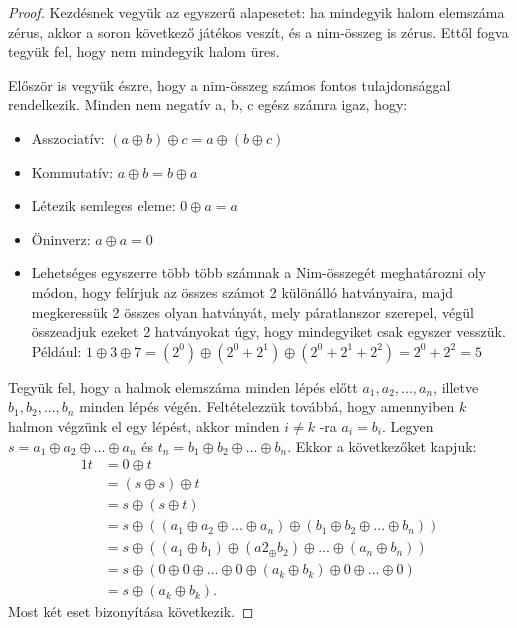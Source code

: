\begin{proof}
Kezdésnek vegyük az egyszerű alapesetet: ha mindegyik halom elemszáma zérus, akkor a soron következő játékos veszít, és a nim-összeg is zérus. Ettől fogva tegyük fel, hogy nem mindegyik halom üres. \ujsor

Először is vegyük észre, hogy a nim-összeg számos fontos tulajdonsággal rendelkezik. Minden nem negatív a, b, c egész számra igaz, hogy:
\begin{itemize}
	\item Asszociatív: $(a \oplus b) \oplus c = a \oplus (b \oplus c)$
	\item Kommutatív: $a \oplus b = b \oplus a$
	\item Létezik semleges eleme: $0 \oplus a = a$
	\item Öninverz: $a \oplus a = 0$
	\item Lehetséges egyszerre több több számnak a Nim-összegét meghatározni oly módon, hogy felírjuk az összes számot 2 különálló hatványaira, majd megkeressük 2 összes olyan hatványát, mely páratlanszor szerepel, végül összeadjuk ezeket 2 hatványokat úgy, hogy mindegyiket csak egyszer vesszük. Például: \ujsor
	$1 \oplus 3 \oplus 7 = (2^0) \oplus (2^0 + 2^1) \oplus (2^0 + 2^1 + 2^2) = 2^0 + 2^2 = 5$
\end{itemize}

Tegyük fel, hogy a halmok elemszáma minden lépés előtt $a_1, a_2, ..., a_n$, illetve \\ $b_1, b_2, ..., b_n$ minden lépés végén. Feltételezzük továbbá, hogy amennyiben $k$ halmon végzünk el egy lépést, akkor minden $i \neq k$ -ra $a_i = b_i$. Legyen $s = a_1 \oplus a_2 \oplus ... \oplus a_n$ és $t_n = b_1 \oplus b_2 \oplus ... \oplus b_n$. Ekkor a következőket kapjuk:
\begin{alignat*}{1}
	t &= 0 \oplus t \\
	&= (s \oplus s) \oplus t \\
	&= s \oplus (s \oplus t) \\
	&= s \oplus ((a_1 \oplus a_2 \oplus ... \oplus a_n) \oplus (b_1 \oplus b_2 \oplus ... \oplus b_n)) \\
	&= s \oplus ((a_1 \oplus b_1) \oplus (a2_ \oplus b_2) \oplus ... \oplus (a_n \oplus b_n)) \\
	&= s \oplus (0 \oplus 0 \oplus ... \oplus 0 \oplus (a_k \oplus b_k) \oplus 0 \oplus ... \oplus 0) \\
	&= s \oplus (a_k \oplus b_k).
\end{alignat*}
Most két eset bizonyítása következik. \ujsor


\end{proof}
